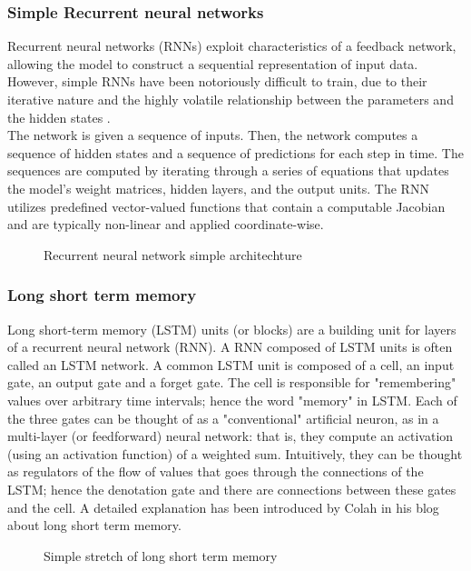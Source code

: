 \documentclass[english]{article}
\makeatletter
\def\maxwidth{\ifdim\Gin@nat@width>\linewidth\linewidth
    \else\Gin@nat@width\fi}
\let\Oldincludegraphics\includegraphics
\renewcommand{\includegraphics}[1]{\Oldincludegraphics[width=.8\maxwidth]{#1}}
\makeatother
\begin{document}
\subsubsection{Simple Recurrent neural networks}
Recurrent neural networks (RNNs) exploit characteristics of a feedback network, allowing the model to construct a sequential representation of input data. However, simple RNNs have been notoriously difficult to train, due to their iterative nature and the highly volatile relationship between the parameters and the hidden states \cite{Bengio}.\\
The network is given a sequence of inputs. Then, the network computes a sequence of hidden states and a sequence of predictions for each step in time. The sequences are computed by iterating through a series of equations that updates the model’s weight matrices, hidden layers, and the output units. The RNN utilizes predefined vector-valued functions that contain a computable Jacobian and are typically non-linear and applied coordinate-wise\cite{Mar}.
\begin{figure}[H]
  \centering
  \caption{Recurrent neural network simple architechture\cite{LSTM}}
\end{figure}

\subsubsection{Long short term memory}
Long short-term memory (LSTM) units (or blocks) are a building unit for layers of a recurrent neural network (RNN). A RNN composed of LSTM units is often called an LSTM network. A common LSTM unit is composed of a cell, an input gate, an output gate and a forget gate. The cell is responsible for "remembering" values over arbitrary time intervals; hence the word "memory" in LSTM. Each of the three gates can be thought of as a "conventional" artificial neuron, as in a multi-layer (or feedforward) neural network: that is, they compute an activation (using an activation function) of a weighted sum. Intuitively, they can be thought as regulators of the flow of values that goes through the connections of the LSTM; hence the denotation gate and there are connections between these gates and the cell. A detailed explanation has been introduced by Colah in his blog about long short term memory\cite{LSTM}.
\begin{figure}[H]
    \centering
    \caption{Simple stretch of long short term memory\cite{LSTM}}
\end{figure}
\end{document}
